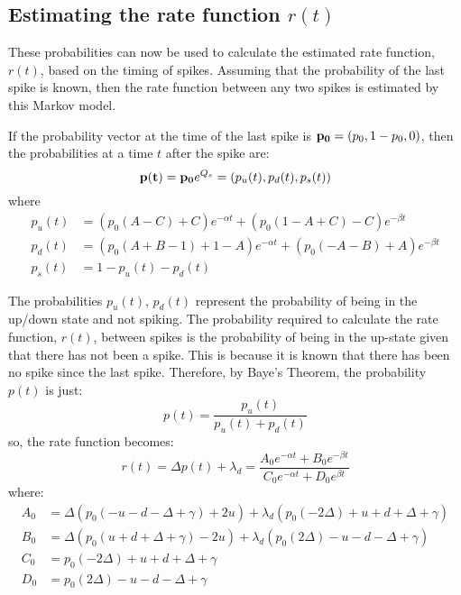\subsection{Estimating the rate function $r(t)$}

These probabilities can now be used to calculate the estimated rate function, $r(t)$, based on the timing of spikes.  Assuming that the probability of the last spike is known, then the rate function between any two spikes is estimated by this Markov model. 

If the probability vector at the time of the last spike is ${\bf p_0}=(p_0, 1-p_0,0)$, then the probabilities at a time $t$ after the spike are:
\begin{equation}
{\bf p(t)} = {\bf p_0}e^{Q_s} = (p_u(t),p_d(t),p_s(t))
\end{equation}
where
\begin{equation}
\begin{split}
p_u(t) &= (p_0(A-C)+C)e^{-\alpha t}+(p_0(1-A+C)-C)e^{-\beta t}\\
p_d(t) &= (p_0(A+B-1)+1-A)e^{-\alpha t}+(p_0(-A-B)+A)e^{-\beta t}\\
p_s(t) &= 1 - p_u(t) - p_d(t)
\end{split}
\end{equation}

The probabilities $p_u(t), \,p_d(t)$ represent the probability of being in the up/down state and not spiking.  The probability required to calculate the rate function, $r(t)$, between spikes is the probability of being in the up-state given that there has not been a spike.  This is because it is known that there has been no spike since the last spike.  Therefore, by Baye's Theorem, the probability $p(t)$ is just:
\begin{equation}
p(t)  = \frac{p_u(t)}{p_u(t) + p_d(t)}
\end{equation}
so, the rate function becomes:
\begin{equation}
r(t) = \Delta p(t) + \lambda_d = \frac{A_0e^{-\alpha t}+B_0e^{-\beta t}}{C_0e^{-\alpha t} + D_0e^{\beta t}}
\end{equation}
where:
\begin{equation}
\begin{split}
\label{abcd}
A_0 & = \Delta(p_0(-u-d-\Delta + \gamma)+2u)+\lambda_d(p_0(-2\Delta)+u+d+\Delta+\gamma)\\
B_0 & =\Delta(p_0(u+d+\Delta + \gamma)-2u)+\lambda_d(p_0(2\Delta)-u-d-\Delta+\gamma)\\
C_0 & = p_0(-2\Delta)+u+d+\Delta+\gamma\\
D_0 & = p_0(2\Delta) -u-d-\Delta + \gamma
\end{split}
\end{equation}

